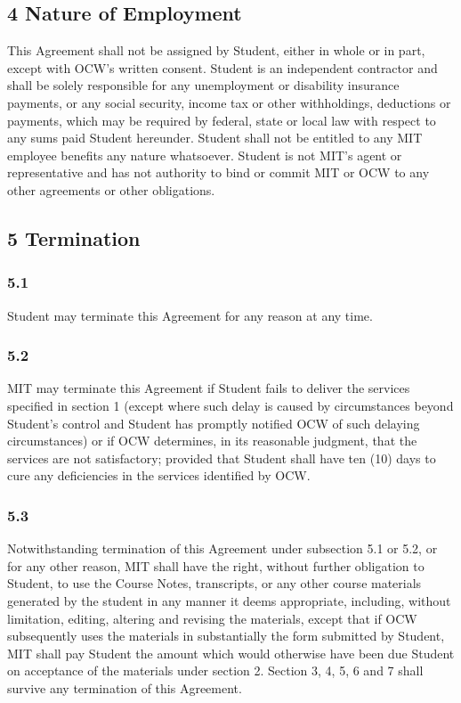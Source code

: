 \documentclass{article}
\begin{document}
\vspace{0.5cm}
\subsection*{4 Nature of Employment}
This Agreement shall not be assigned by Student, either in whole or in part, except with OCW’s written consent. Student is an independent contractor and shall be solely responsible for any unemployment or disability insurance payments, or any social security, income tax or other withholdings, deductions or payments, which may be required by federal, state or local law with respect to any sums paid Student hereunder. Student shall not be entitled to any MIT employee benefits any nature whatsoever. Student is not MIT’s agent or representative and has not authority to bind or commit MIT or OCW to any other agreements or other obligations.

\vspace{0.5cm}
\subsection*{5 Termination}
\subsubsection*{5.1}
Student may terminate this Agreement for any reason at any time.

\subsubsection*{5.2}
MIT may terminate this Agreement if Student fails to deliver the services specified in section 1 (except where such delay is caused by circumstances beyond Student’s control and Student has promptly notified OCW of such delaying circumstances) or if OCW determines, in its reasonable judgment, that the services are not satisfactory; provided that Student shall have ten (10) days to cure any deficiencies in the services identified by OCW.

\subsubsection*{5.3}
Notwithstanding termination of this Agreement under subsection 5.1 or 5.2, or for any other reason, MIT shall have the right, without further obligation to Student, to use the Course Notes, transcripts, or any other course materials generated by the student  in any manner it deems appropriate, including, without limitation, editing, altering and revising the materials, except that if OCW subsequently uses the materials in substantially the form submitted by Student, MIT shall pay Student the amount which would otherwise have been due Student on acceptance of the materials under section 2. Section 3, 4, 5, 6 and 7 shall survive any termination of this Agreement.
\end{document}
